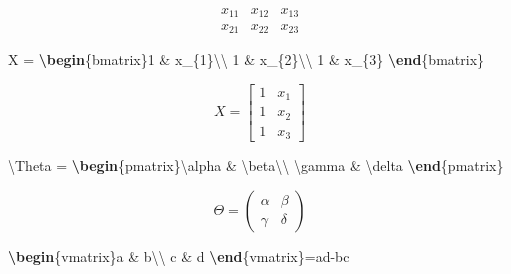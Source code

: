 \documentclass[
]{book}
\newenvironment{Shaded}{\begin{snugshade}}{\end{snugshade}}
\newcommand{\ExtensionTok}[1]{#1}
\newcommand{\KeywordTok}[1]{\textcolor[rgb]{0.13,0.29,0.53}{\textbf{#1}}}
\newcommand{\NormalTok}[1]{#1}
\newcommand{\SpecialCharTok}[1]{\textcolor[rgb]{0.00,0.00,0.00}{#1}}
\newcommand{\SpecialStringTok}[1]{\textcolor[rgb]{0.31,0.60,0.02}{#1}}
\begin{document}
\[\begin{array}{ccc}
x_{11} & x_{12} & x_{13}\\
x_{21} & x_{22} & x_{23}
\end{array}\]

\begin{Shaded}
\begin{Highlighting}[]
\SpecialStringTok{$$X = }\KeywordTok{\textbackslash{}begin}\NormalTok{\{}\ExtensionTok{bmatrix}\NormalTok{\}}\SpecialStringTok{1 \& x\_\{1\}}\SpecialCharTok{\textbackslash{}\textbackslash{}}
\SpecialStringTok{1 \& x\_\{2\}}\SpecialCharTok{\textbackslash{}\textbackslash{}}
\SpecialStringTok{1 \& x\_\{3\}}
\KeywordTok{\textbackslash{}end}\NormalTok{\{}\ExtensionTok{bmatrix}\NormalTok{\}}\SpecialStringTok{$$}
\end{Highlighting}
\end{Shaded}

\[X = \begin{bmatrix}1 & x_{1}\\
1 & x_{2}\\
1 & x_{3}
\end{bmatrix}\]

\begin{Shaded}
\begin{Highlighting}[]
\SpecialStringTok{$$}\SpecialCharTok{\textbackslash{}Theta}\SpecialStringTok{ = }\KeywordTok{\textbackslash{}begin}\NormalTok{\{}\ExtensionTok{pmatrix}\NormalTok{\}}\SpecialCharTok{\textbackslash{}alpha}\SpecialStringTok{ \& }\SpecialCharTok{\textbackslash{}beta\textbackslash{}\textbackslash{}}
\SpecialCharTok{\textbackslash{}gamma}\SpecialStringTok{ \& }\SpecialCharTok{\textbackslash{}delta}
\KeywordTok{\textbackslash{}end}\NormalTok{\{}\ExtensionTok{pmatrix}\NormalTok{\}}\SpecialStringTok{$$}
\end{Highlighting}
\end{Shaded}

\[\Theta = \begin{pmatrix}\alpha & \beta\\
\gamma & \delta
\end{pmatrix}\]

\begin{Shaded}
\begin{Highlighting}[]
\SpecialStringTok{$$}\KeywordTok{\textbackslash{}begin}\NormalTok{\{}\ExtensionTok{vmatrix}\NormalTok{\}}\SpecialStringTok{a \& b}\SpecialCharTok{\textbackslash{}\textbackslash{}}
\SpecialStringTok{c \& d}
\KeywordTok{\textbackslash{}end}\NormalTok{\{}\ExtensionTok{vmatrix}\NormalTok{\}}\SpecialStringTok{=ad{-}bc$$}
\end{Highlighting}
\end{Shaded}
\end{document}
